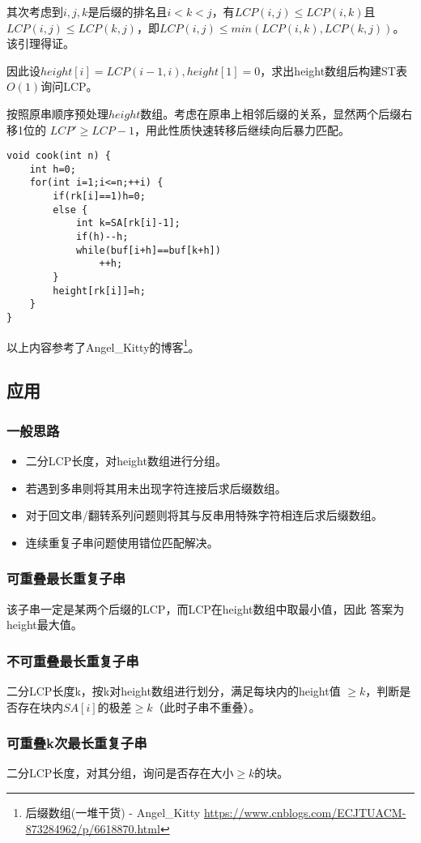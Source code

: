其次考虑到$i,j,k$是后缀的排名且$i<k<j$，有$LCP(i,j)\leq LCP(i,k)$且
$LCP(i,j)\leq LCP(k,j)$，即$LCP(i,j)\leq min(LCP(i,k),LCP(k,j))$。
该引理得证。

因此设$height[i]=LCP(i-1,i),height[1]=0$，求出height数组后构建ST表$O(1)$询问LCP。

按照原串顺序预处理$height$数组。考虑在原串上相邻后缀的关系，显然两个后缀右移1位的
$LCP'\geq LCP-1$，用此性质快速转移后继续向后暴力匹配。

\begin{lstlisting}
void cook(int n) {
    int h=0;
    for(int i=1;i<=n;++i) {
        if(rk[i]==1)h=0;
        else {
            int k=SA[rk[i]-1];
            if(h)--h;
            while(buf[i+h]==buf[k+h])
                ++h;
        }
        height[rk[i]]=h;
    }
}
\end{lstlisting}
以上内容参考了Angel\_Kitty的博客\footnote{后缀数组(一堆干货) - Angel\_Kitty
    \url{https://www.cnblogs.com/ECJTUACM-873284962/p/6618870.html}
}。
\subsection{应用}
\subsubsection{一般思路}
\begin{itemize}
    \item 二分LCP长度，对height数组进行分组。
    \item 若遇到多串则将其用未出现字符连接后求后缀数组。
    \item 对于回文串/翻转系列问题则将其与反串用特殊字符相连后求后缀数组。
    \item 连续重复子串问题使用错位匹配解决。
\end{itemize}
\subsubsection{可重叠最长重复子串}
该子串一定是某两个后缀的LCP，而LCP在height数组中取最小值，因此
答案为height最大值。
\subsubsection{不可重叠最长重复子串}
二分LCP长度k，按k对height数组进行划分，满足每块内的height值
$\geq k$，判断是否存在块内$SA[i]$的极差$\geq k$（此时子串不重叠）。
\subsubsection{可重叠k次最长重复子串}
二分LCP长度，对其分组，询问是否存在大小$\geq k$的块。
